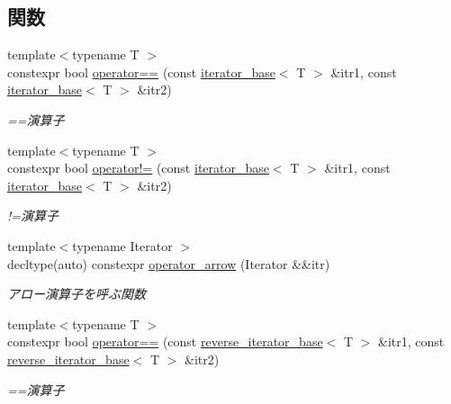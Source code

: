 \subsection*{関数}
\begin{DoxyCompactItemize}
\item 
{\footnotesize template$<$typename T $>$ }\\constexpr bool \mbox{\hyperlink{namespacesaki_1_1details_ac09d938c2d3cea1119bb4a46a2c2a1b1}{operator==}} (const \mbox{\hyperlink{classsaki_1_1details_1_1iterator__base}{iterator\+\_\+base}}$<$ T $>$ \&itr1, const \mbox{\hyperlink{classsaki_1_1details_1_1iterator__base}{iterator\+\_\+base}}$<$ T $>$ \&itr2)
\begin{DoxyCompactList}\small\item\em ==演算子 \end{DoxyCompactList}\item 
{\footnotesize template$<$typename T $>$ }\\constexpr bool \mbox{\hyperlink{namespacesaki_1_1details_ab425131a223957045b2744e15c53d36f}{operator!=}} (const \mbox{\hyperlink{classsaki_1_1details_1_1iterator__base}{iterator\+\_\+base}}$<$ T $>$ \&itr1, const \mbox{\hyperlink{classsaki_1_1details_1_1iterator__base}{iterator\+\_\+base}}$<$ T $>$ \&itr2)
\begin{DoxyCompactList}\small\item\em !=演算子 \end{DoxyCompactList}\item 
{\footnotesize template$<$typename Iterator $>$ }\\decltype(auto) constexpr \mbox{\hyperlink{namespacesaki_1_1details_adc4632dd965cb0131ddadd1bacbe4971}{operator\+\_\+arrow}} (Iterator \&\&itr)
\begin{DoxyCompactList}\small\item\em アロー演算子を呼ぶ関数 \end{DoxyCompactList}\item 
{\footnotesize template$<$typename T $>$ }\\constexpr bool \mbox{\hyperlink{namespacesaki_1_1details_ac39a55e205a0ce7eca13df0569358fe2}{operator==}} (const \mbox{\hyperlink{classsaki_1_1details_1_1reverse__iterator__base}{reverse\+\_\+iterator\+\_\+base}}$<$ T $>$ \&itr1, const \mbox{\hyperlink{classsaki_1_1details_1_1reverse__iterator__base}{reverse\+\_\+iterator\+\_\+base}}$<$ T $>$ \&itr2)
\begin{DoxyCompactList}\small\item\em ==演算子 \end{DoxyCompactList}\item 

\end{DoxyCompactItemize}
